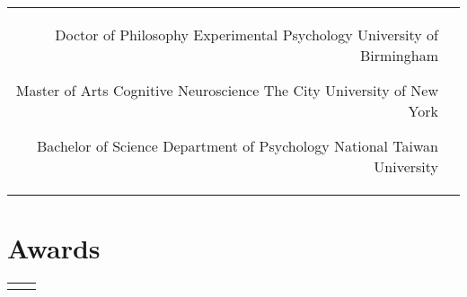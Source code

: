 \documentclass[10pt]{article} %
\begin{document}
\begin{paracol}{2}
\begin{supertabular}{rl}
	
	{Doctor of Philosophy} %
	{} %
	{Experimental Psychology} %
	{University of Birmingham} %
	
	
	{Master of Arts} %
	{Cognitive Neuroscience} %
	{The City University of New York} %
	
	
	{Bachelor of Science} %
	{Department of Psychology} %
	{National Taiwan University} %
	

\end{supertabular}


\section{Awards}





\begin{supertabular}{rl} %
	
	
	

\end{supertabular}
\end{paracol}
\end{document}
